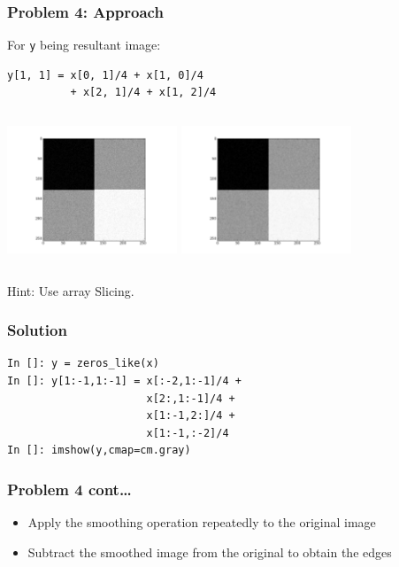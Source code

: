 \documentclass[14pt,compress]{beamer}
\newcommand{\typ}[1]{\lstinline{#1}}
\begin{document}
\begin{frame}[fragile]
  \frametitle{Problem 4: Approach}
  For \typ{y} being resultant image:
  \begin{lstlisting}
y[1, 1] = x[0, 1]/4 + x[1, 0]/4
          + x[2, 1]/4 + x[1, 2]/4
  \end{lstlisting}
   \begin{columns}
    \hspace*{-0.5in}
    \includegraphics[height=1.5in, interpolate=true]{data/exercises/smoothing}
    \hspace*{-0.5in}
    \includegraphics[height=1.5in, interpolate=true]{data/exercises/after-filter}
  \end{columns}
   \begin{block}{Hint:}
     Use array Slicing.
   \end{block}
\end{frame}

\begin{frame}[fragile]
  \frametitle{Solution}
  \begin{lstlisting}
In []: y = zeros_like(x)
In []: y[1:-1,1:-1] = x[:-2,1:-1]/4 +
                      x[2:,1:-1]/4 +
                      x[1:-1,2:]/4 +
                      x[1:-1,:-2]/4
In []: imshow(y,cmap=cm.gray)
  \end{lstlisting}
\end{frame}

\begin{frame}[fragile]
  \frametitle{Problem 4 cont\ldots}
  \begin{itemize}
      \item Apply the smoothing operation repeatedly to the original
          image

      \item Subtract the smoothed image from the original to obtain
          the edges
  \end{itemize}
\end{frame}
\end{document}
